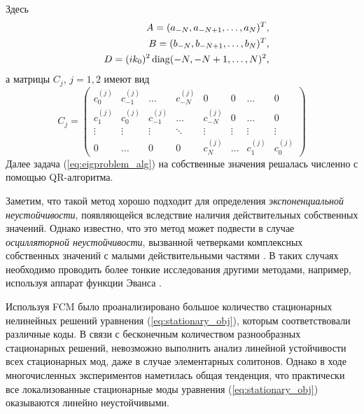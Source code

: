 %
Здесь
%
\begin{eqnarray}
&& A = (a_{-N}, a_{-N+1}, \dots, a_N)^T, \\
&& B = (b_{-N}, b_{-N+1}, \dots, b_N)^T, \\
&& D = (i k_0)^2 \mathop{\mathrm{diag}}(-N, -N+1, \dots, N)^2, 
\end{eqnarray}
%
а матрицы $C_j$, $j = 1,2$ имеют вид
%
\begin{equation}
C_j = 
\begin{pmatrix}
c_0^{(j)} & c_{-1}^{(j)} & \dots & c_{-N}^{(j)} & 0 & 0 & \dots & 0 \\
c_1^{(j)} & c_0^{(j)} & c_{-1}^{(j)} & \dots & c_{-N}^{(j)} & 0 & \dots & 0 \\
\vdots & \vdots & \vdots & \ddots & \vdots & \vdots & \vdots & \vdots \\
0 &\dots & 0 & 0 & c_N^{(j)} & \dots & c_1^{(j)} & c_0^{(j)}
\end{pmatrix}
\end{equation}
%
Далее задача (\ref{eq:eigproblem_alg}) на собственные значения решалась численно с помощью QR-алгоритма.

Заметим, что такой метод хорошо подходит для определения {\it экспоненциальной неустойчивости}, появляющейся вследствие наличия действительных  собственных значений.
Однако известно, что это метод может подвести в случае {\it осцилляторной неустойчивости}, вызванной четверками комплексных собственных значений с малыми действительными частями \cite{Kizin}.
В таких случаях необходимо проводить более тонкие исследования другими методами, например, используя аппарат функции Эванса \cite{Pelinovsky}.

Используя FCM было проанализировано большое количество стационарных нелинейных решений уравнения (\ref{eq:stationary_obj}), которым соответствовали различные коды.
В связи с бесконечным количеством разнообразных стационарных решений, невозможно выполнить анализ линейной устойчивости всех стационарных мод, даже в случае элементарных солитонов.
Однако в ходе многочисленных экспериментов наметилась общая тенденция, что практически все локализованные стационарные моды уравнения (\ref{eq:stationary_obj}) оказываются линейно неустойчивыми.

